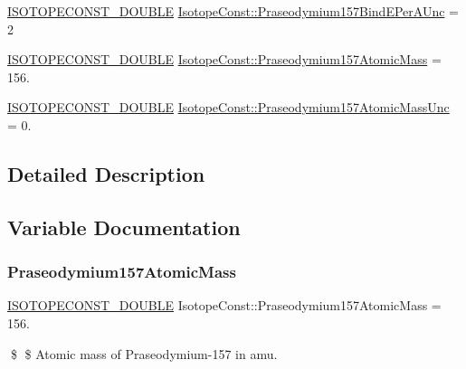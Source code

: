 \begin{DoxyCompactItemize}
\item 
\mbox{\hyperlink{group___isotope_const-_macros_ga8f45a7272ce02c0b4c65c44636ed719a}{I\+S\+O\+T\+O\+P\+E\+C\+O\+N\+S\+T\+\_\+\+D\+O\+U\+B\+LE}} \mbox{\hyperlink{group___isotope_const-_praseodymium-_pr157_gae52fe54337c9877a11a6534b51761e93}{Isotope\+Const\+::\+Praseodymium157\+Bind\+E\+Per\+A\+Unc}} = 2
\item 
\mbox{\hyperlink{group___isotope_const-_macros_ga8f45a7272ce02c0b4c65c44636ed719a}{I\+S\+O\+T\+O\+P\+E\+C\+O\+N\+S\+T\+\_\+\+D\+O\+U\+B\+LE}} \mbox{\hyperlink{group___isotope_const-_praseodymium-_pr157_ga2f419999fbd40ce381ac4343780d8cad}{Isotope\+Const\+::\+Praseodymium157\+Atomic\+Mass}} = 156.
\item 
\mbox{\hyperlink{group___isotope_const-_macros_ga8f45a7272ce02c0b4c65c44636ed719a}{I\+S\+O\+T\+O\+P\+E\+C\+O\+N\+S\+T\+\_\+\+D\+O\+U\+B\+LE}} \mbox{\hyperlink{group___isotope_const-_praseodymium-_pr157_ga4fb34019aa51d3d706ca9c882a28edea}{Isotope\+Const\+::\+Praseodymium157\+Atomic\+Mass\+Unc}} = 0.
\end{DoxyCompactItemize}


\subsection{Detailed Description}


\subsection{Variable Documentation}
\mbox{\label{group___isotope_const-_praseodymium-_pr157_ga2f419999fbd40ce381ac4343780d8cad}} 
\subsubsection{\texorpdfstring{Praseodymium157\+Atomic\+Mass}{Praseodymium157AtomicMass}}
{\footnotesize\ttfamily \mbox{\hyperlink{group___isotope_const-_macros_ga8f45a7272ce02c0b4c65c44636ed719a}{I\+S\+O\+T\+O\+P\+E\+C\+O\+N\+S\+T\+\_\+\+D\+O\+U\+B\+LE}} Isotope\+Const\+::\+Praseodymium157\+Atomic\+Mass = 156.}

\$ \$ Atomic mass of Praseodymium-\/157 in amu. \mbox{\label{group___isotope_const-_praseodymium-_pr157_ga4fb34019aa51d3d706ca9c882a28edea}} 

